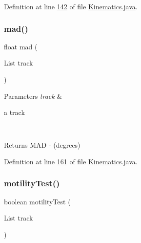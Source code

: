 Definition at line \hyperlink{_kinematics_8java_source_l00142}{142} of file \hyperlink{_kinematics_8java_source}{Kinematics.\+java}.

\hypertarget{classfunctions_1_1_kinematics_a2b60196aad8d0eecb1c3048e0163ebc3}{}\label{classfunctions_1_1_kinematics_a2b60196aad8d0eecb1c3048e0163ebc3} 
\subsubsection{\texorpdfstring{mad()}{mad()}}
{\footnotesize\ttfamily float mad (\begin{DoxyParamCaption}\item[{List}]{track }\end{DoxyParamCaption})}


\begin{DoxyParams}{Parameters}
{\em track} & 
\begin{DoxyItemize}
\item a track 
\end{DoxyItemize}\\
\hline
\end{DoxyParams}
\begin{DoxyReturn}{Returns}
M\+AD -\/ (degrees) 
\end{DoxyReturn}


Definition at line \hyperlink{_kinematics_8java_source_l00161}{161} of file \hyperlink{_kinematics_8java_source}{Kinematics.\+java}.

\hypertarget{classfunctions_1_1_kinematics_a5dbef047c19d4c554b08ba879eb7443f}{}\label{classfunctions_1_1_kinematics_a5dbef047c19d4c554b08ba879eb7443f} 
\subsubsection{\texorpdfstring{motility\+Test()}{motilityTest()}\hspace{0.1cm}{\footnotesize\ttfamily [1/2]}}
{\footnotesize\ttfamily boolean motility\+Test (\begin{DoxyParamCaption}\item[{List}]{track }\end{DoxyParamCaption})}


